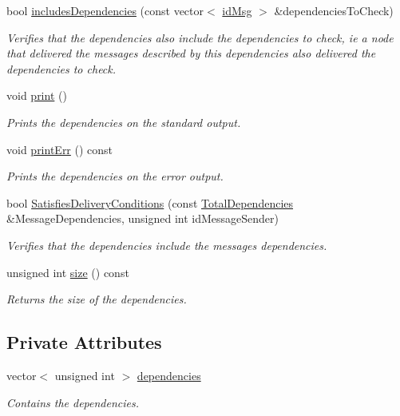 \begin{DoxyCompactItemize}
bool \hyperlink{class_total_dependencies_aed1c3ce4bee031ca9341d8ce4a179ef0}{includes\+Dependencies} (const vector$<$ \hyperlink{structures_8h_a83a1d9a070efa5341da84cfd8e28d3e5}{id\+Msg} $>$ \&dependencies\+To\+Check)
\begin{DoxyCompactList}\small\item\em Verifies that the dependencies also include the dependencies to check, ie a node that delivered the messages described by this dependencies also delivered the dependencies to check. \end{DoxyCompactList}\item 
void \hyperlink{class_total_dependencies_abd5c49f26000acb2c45d8b967922c7e7}{print} ()
\begin{DoxyCompactList}\small\item\em Prints the dependencies on the standard output. \end{DoxyCompactList}\item 
void \hyperlink{class_total_dependencies_a514df10fe452f2000ceec5e279eae802}{print\+Err} () const
\begin{DoxyCompactList}\small\item\em Prints the dependencies on the error output. \end{DoxyCompactList}\item 
bool \hyperlink{class_total_dependencies_a6d050146cb0298091a4614610997d772}{Satisfies\+Delivery\+Conditions} (const \hyperlink{class_total_dependencies}{Total\+Dependencies} \&Message\+Dependencies, unsigned int id\+Message\+Sender)
\begin{DoxyCompactList}\small\item\em Verifies that the dependencies include the message\textquotesingle{}s dependencies. \end{DoxyCompactList}\item 
unsigned int \hyperlink{class_total_dependencies_a00ea27540cc51d5770d6013a21a41de2}{size} () const
\begin{DoxyCompactList}\small\item\em Returns the size of the dependencies. \end{DoxyCompactList}\end{DoxyCompactItemize}
\subsection*{Private Attributes}
\begin{DoxyCompactItemize}
\item 
vector$<$ unsigned int $>$ \hyperlink{class_total_dependencies_a94825b4f782c30dfebf69dd2eba0bb1f}{dependencies}
\begin{DoxyCompactList}\small\item\em Contains the dependencies. \end{DoxyCompactList}\end{DoxyCompactItemize}


